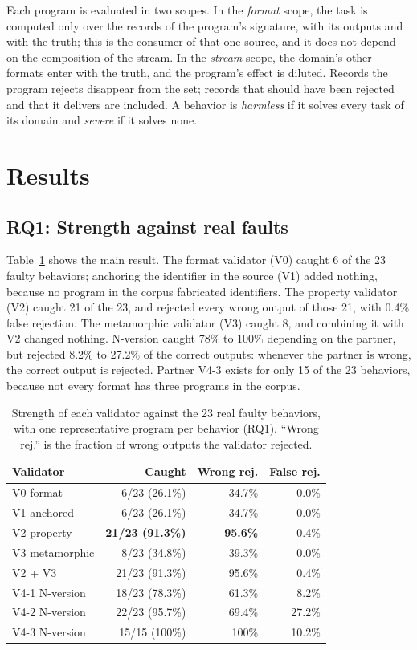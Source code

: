 \documentclass[sigconf,nonacm]{acmart}
\begin{document}
Each program is evaluated in two scopes. In the \textit{format} scope, the task is computed only over the records of the program's signature, with its outputs and with the truth; this is the consumer of that one source, and it does not depend on the composition of the stream. In the \textit{stream} scope, the domain's other formats enter with the truth, and the program's effect is diluted. Records the program rejects disappear from the set; records that should have been rejected and that it delivers are included. A behavior is \textit{harmless} if it solves every task of its domain and \textit{severe} if it solves none.

\section{Results}

\subsection{RQ1: Strength against real faults}
\label{sec:rq1}

Table~\ref{tab:rq1} shows the main result. The format validator (V0) caught 6 of the 23 faulty behaviors; anchoring the identifier in the source (V1) added nothing, because no program in the corpus fabricated identifiers. The property validator (V2) caught 21 of the 23, and rejected every wrong output of those 21, with 0.4\% false rejection. The metamorphic validator (V3) caught 8, and combining it with V2 changed nothing. N-version caught 78\% to 100\% depending on the partner, but rejected 8.2\% to 27.2\% of the correct outputs: whenever the partner is wrong, the correct output is rejected. Partner V4-3 exists for only 15 of the 23 behaviors, because not every format has three programs in the corpus.

\begin{table}[t]
\caption{Strength of each validator against the 23 real faulty behaviors, with one representative program per behavior (RQ1). ``Wrong rej.'' is the fraction of wrong outputs the validator rejected.}
\label{tab:rq1}
\small
\begin{tabular}{lrrr}
\toprule
Validator & Caught & Wrong rej. & False rej. \\
\midrule
V0 format & 6/23 (26.1\%) & 34.7\% & 0.0\% \\
V1 anchored & 6/23 (26.1\%) & 34.7\% & 0.0\% \\
V2 property & \textbf{21/23 (91.3\%)} & \textbf{95.6\%} & 0.4\% \\
V3 metamorphic & 8/23 (34.8\%) & 39.3\% & 0.0\% \\
V2 + V3 & 21/23 (91.3\%) & 95.6\% & 0.4\% \\
V4-1 N-version & 18/23 (78.3\%) & 61.3\% & 8.2\% \\
V4-2 N-version & 22/23 (95.7\%) & 69.4\% & 27.2\% \\
V4-3 N-version & 15/15 (100\%) & 100\% & 10.2\% \\
\bottomrule
\end{tabular}
\end{table}
\end{document}
